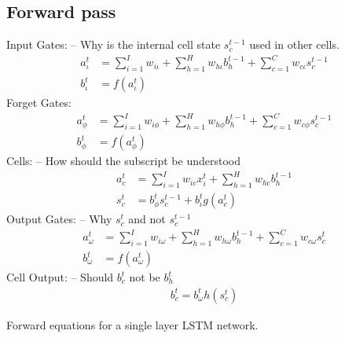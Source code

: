 \subsection{Forward pass}

\begin{equationbox}[H]
Input Gates: -- Why is the internal cell state $s_c^{t-1}$ used in other cells.
\begin{equation*}
\begin{aligned}
a_\iota^t &= \sum_{i=1}^I w_{i \iota} + \sum_{h=1}^H w_{h \iota} b_h^{t-1} + \sum_{c=1}^C w_{c \iota} s_c^{t-1} \\
b_\iota^t &= f(a_\iota^t)
\end{aligned}
\end{equation*}
Forget Gates:
\begin{equation*}
\begin{aligned}
a_\phi^t &= \sum_{i=1}^I w_{i\phi} + \sum_{h=1}^H w_{h \phi} b_h^{t-1} + \sum_{c=1}^C w_{c \phi} s_c^{t-1} \\
b_\phi^t &= f(a_\phi^t)
\end{aligned}
\end{equation*}
Cells: -- How should the subscript be understood
\begin{equation*}
\begin{aligned}
a_c^t &= \sum_{i=1}^I w_{i c} x_i^t + \sum_{h=1}^H w_{h c} b_h^{t-1} \\
s_c^t &= b_\phi^t s_c^{t-1} + b_{\iota}^t g(a_c^t)
\end{aligned}
\end{equation*}
Output Gates: -- Why $s_c^t$ and not $s_c^{t-1}$
\begin{equation*}
\begin{aligned}
a_\omega^t &= \sum_{i=1}^I w_{i\omega} + \sum_{h=1}^H w_{h \omega} b_h^{t-1} + \sum_{c=1}^C w_{c \omega} s_c^t \\
b_\omega^t &= f(a_\omega^t)
\end{aligned}
\end{equation*}
Cell Output: -- Should $b_c^t$ not be $b_h^t$
\begin{equation*}
\begin{aligned}
b_c^t = b_\omega^t h(s_c^t)
\end{aligned}
\end{equation*}
\caption{Forward equations for a single layer LSTM network.}
\end{equationbox}
